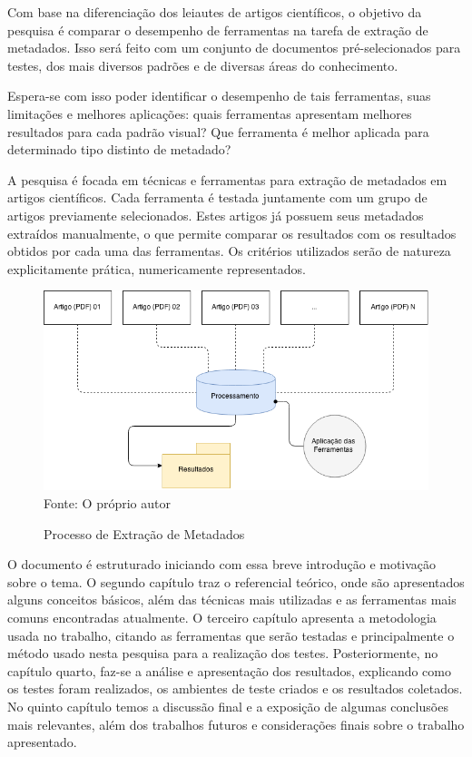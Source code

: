 Com base na diferenciação dos leiautes de artigos científicos, o objetivo da pesquisa é comparar o desempenho de ferramentas na tarefa de extração de metadados. Isso será feito com um conjunto de documentos pré-selecionados para testes, dos mais diversos padrões e de diversas áreas do conhecimento.

Espera-se com isso poder identificar o desempenho de tais ferramentas, suas limitações e melhores aplicações: quais ferramentas apresentam melhores resultados para cada padrão visual? Que ferramenta é melhor aplicada para determinado tipo distinto de metadado?

A pesquisa é focada em técnicas e ferramentas para extração de metadados em artigos científicos. Cada ferramenta é testada juntamente com um grupo de artigos previamente selecionados. Estes artigos já possuem seus metadados extraídos manualmente, o que permite comparar os resultados com os resultados obtidos por cada uma das ferramentas. Os critérios utilizados serão de natureza explicitamente prática, numericamente representados.

\begin{figure}[h!]
    \centering
    \caption{Processo de Extração de Metadados}
    \label{fig:introduction}
    \includegraphics[width=0.8\linewidth]{./assets/images/introduction}
    \center\footnotesize{Fonte: O próprio autor}
\end{figure}

O documento é estruturado iniciando com essa breve introdução e motivação sobre o tema. O segundo capítulo traz o referencial teórico, onde são apresentados alguns conceitos básicos, além das técnicas mais utilizadas e as ferramentas mais comuns encontradas atualmente. O terceiro capítulo apresenta a metodologia usada no trabalho, citando as ferramentas que serão testadas e principalmente o método usado nesta pesquisa para a realização dos testes. Posteriormente, no capítulo quarto, faz-se a análise e apresentação dos resultados, explicando como os testes foram realizados, os ambientes de teste criados e os resultados coletados. No quinto capítulo temos a discussão final e a exposição de algumas conclusões mais relevantes, além dos trabalhos futuros e considerações finais sobre o trabalho apresentado.

